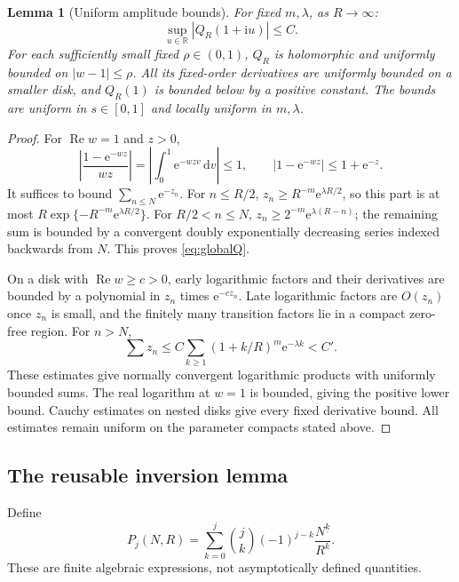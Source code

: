 \documentclass[11pt,a4paper]{article}
\numberwithin{equation}{section}
\newtheorem{lemma}[theorem]{Lemma}
\theoremstyle{definition}
\newcommand{\R}{\mathbb R}
\newcommand{\dd}{\,\mathrm d}
\newcommand{\ii}{\mathrm i}
\newcommand{\ee}{\mathrm e}
\newcommand{\fall}[2]{#1^{\underline{#2}}}
\begin{document}
\begin{lemma}[Uniform amplitude bounds]
\label{lem:amplitude}
For fixed $m,\lambda$, as $R\to\infty$:
\begin{equation}
 \sup_{u\in\R}|Q_R(1+\ii u)|\leq C.
 \label{eq:globalQ}
\end{equation}
For each sufficiently small fixed $\rho\in(0,1)$, $Q_R$ is holomorphic and uniformly bounded on $|w-1|\leq\rho$. All its fixed-order derivatives are uniformly bounded on a smaller disk, and $Q_R(1)$ is bounded below by a positive constant. The bounds are uniform in $s\in[0,1]$ and locally uniform in $m,\lambda$.
\end{lemma}

\begin{proof}
For $\operatorname{Re}w=1$ and $z>0$,
\[
 \left|\frac{1-\ee^{-wz}}{wz}\right|
 =\left|\int_0^1\ee^{-wzv}\dd v\right|\leq1,
 \qquad |1-\ee^{-wz}|\leq1+\ee^{-z}.
\]
It suffices to bound $\sum_{n\leq N}\ee^{-z_n}$. For $n\leq R/2$,
$z_n\geq R^{-m}\ee^{\lambda R/2}$, so this part is at most
$R\exp\{-R^{-m}\ee^{\lambda R/2}\}$. For $R/2<n\leq N$,
$z_n\geq2^{-m}\ee^{\lambda(R-n)}$; the remaining sum is bounded by a convergent doubly exponentially decreasing series indexed backwards from $N$. This proves \eqref{eq:globalQ}.

On a disk with $\operatorname{Re}w\geq c>0$, early logarithmic factors and their derivatives are bounded by a polynomial in $z_n$ times $\ee^{-cz_n}$. Late logarithmic factors are $O(z_n)$ once $z_n$ is small, and the finitely many transition factors lie in a compact zero-free region. For $n>N$,
\[
 \sum z_n\leq C\sum_{k\geq1}(1+k/R)^m\ee^{-\lambda k}<C'.
\]
These estimates give normally convergent logarithmic products with uniformly bounded sums. The real logarithm at $w=1$ is bounded, giving the positive lower bound. Cauchy estimates on nested disks give every fixed derivative bound. All estimates remain uniform on the parameter compacts stated above.
\end{proof}

\subsection{The reusable inversion lemma}
Define
\begin{equation}
 P_j(N,R)=\sum_{k=0}^j\binom jk(-1)^{j-k}
 \frac{\fall N k}{R^k}.
 \label{eq:Pj}
\end{equation}
These are finite algebraic expressions, not asymptotically defined quantities.
\end{document}
